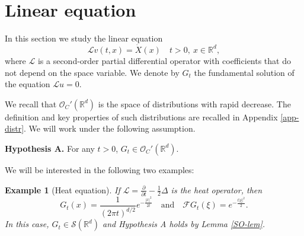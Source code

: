 \documentclass[12pt]{article}
\newtheorem{example}[theorem]{Example}
\def\cF{\mathcal{F}}
\def\cL{\mathcal{L}}
\def\cO{\mathcal{O}}
\def\cS{\mathcal{S}}
\def\bR{\mathbb{R}}
\begin{document}
\section{Linear equation}
\label{section-lin}

In this section we study the linear equation
\begin{equation}
\label{lin-eq}
\cL v(t,x)=\dot{X}(x) \quad t>0,\ x\in \bR^d,
\end{equation}
where $\cL$ is a second-order partial differential operator with coefficients that do not depend on the space variable. We denote by $G_t$ the fundamental solution of the equation $\cL u=0$.  

We recall that $\cO_C'(\bR^d)$ is the space of distributions with rapid decrease. The definition and key properties of such distributions are recalled in Appendix \ref{app-distr}. We will work under the following assumption.

\medskip


{\bf Hypothesis A.} For any $t>0$, $G_t \in \cO_C'(\bR^d)$.


\medskip

We will be interested in the following two examples:

\begin{example}[Heat equation] If $\cL=\frac{\partial}{\partial t}-\frac{1}{2}\Delta$ is the heat operator, 
then
\[
G_t(x)=\frac{1}{(2\pi t)^{d/2}} e^{-\frac{|x|^2}{2t}} \quad \mbox{and} \quad \cF G_t(\xi)=e^{-\frac{t|\xi|^2}{2}}.
\]
In this case, $G_t\in \cS(\bR^d)$ and Hypothesis A holds by Lemma \ref{SO-lem}.
\end{example}
\end{document}
